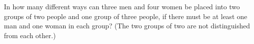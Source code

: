 In how many different ways can three men and four women be placed into two groups of two people and one group of three people, if there must be at least one man and one woman in each group? (The two groups of two are not distinguished from each other.)
